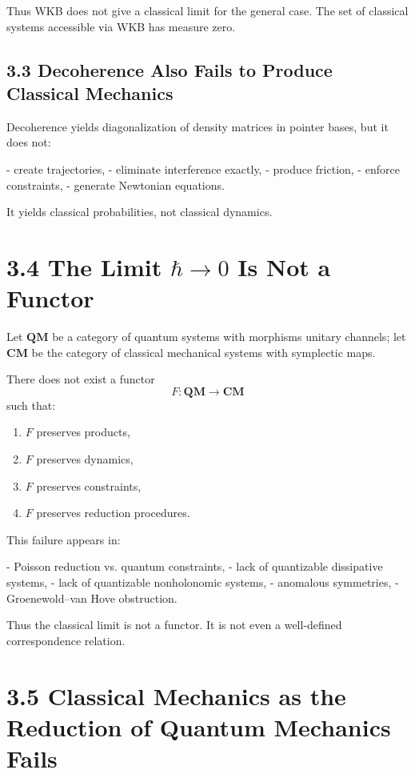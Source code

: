 \documentclass[12pt,oneside]{book}
\theoremstyle{plain}
\theoremstyle{definition}
\begin{document}
Thus WKB does not give a classical limit for the general case.  
The set of classical systems accessible via WKB has measure zero.

\subsection{3.3 Decoherence Also Fails to Produce Classical Mechanics}

Decoherence yields diagonalization of density matrices in pointer bases, but it does not:

- create trajectories,
- eliminate interference exactly,
- produce friction,
- enforce constraints,
- generate Newtonian equations.

It yields classical probabilities, not classical dynamics.

\section{3.4 The Limit $\hbar \to 0$ Is Not a Functor}

Let $\mathbf{QM}$ be a category of quantum systems with morphisms unitary channels;  
let $\mathbf{CM}$ be the category of classical mechanical systems with symplectic maps.

There does not exist a functor  
\[
F: \mathbf{QM} \to \mathbf{CM}
\]
such that:

\begin{enumerate}
\item $F$ preserves products,
\item $F$ preserves dynamics,
\item $F$ preserves constraints,
\item $F$ preserves reduction procedures.
\end{enumerate}

This failure appears in:

- Poisson reduction vs. quantum constraints,
- lack of quantizable dissipative systems,
- lack of quantizable nonholonomic systems,
- anomalous symmetries,
- Groenewold–van Hove obstruction.

Thus the classical limit is not a functor.  
It is not even a well-defined correspondence relation.

\section{3.5 Classical Mechanics as the Reduction of Quantum Mechanics Fails}
\end{document}

